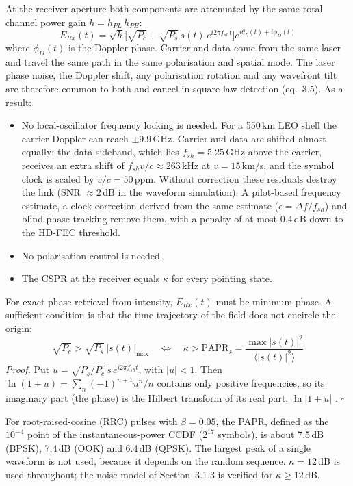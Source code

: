 At the receiver aperture both components are attenuated by the same total channel power gain $h=h_{PL}\,h_{PE}$:
\begin{equation}
E_{Rx}(t)=\sqrt{h}\Big[\sqrt{P_c}+\sqrt{P_s}\,s(t)\,e^{i2\pi f_{sh}t}\Big]e^{i\theta_L(t)+i\phi_D(t)}
\end{equation}
where $\phi_D(t)$ is the Doppler phase. Carrier and data come from the same laser and travel the same path in the same polarisation and spatial mode. The laser phase noise, the Doppler shift, any polarisation rotation and any wavefront tilt are therefore common to both and cancel in square-law detection (eq.~3.5). As a result:
\begin{itemize}
\item No local-oscillator frequency locking is needed. For a 550\,km LEO shell the carrier Doppler can reach $\pm9.9$\,GHz. Carrier and data are shifted almost equally; the data sideband, which lies $f_{sh}=5.25$\,GHz above the carrier, receives an extra shift of $f_{sh}v/c\approx263$\,kHz at $v=15$\,km/s, and the symbol clock is scaled by $v/c=50$\,ppm. Without correction these residuals destroy the link (SNR $\approx2$\,dB in the waveform simulation). A pilot-based frequency estimate, a clock correction derived from the same estimate ($\epsilon=\Delta f/f_{sh}$) and blind phase tracking remove them, with a penalty of at most 0.4\,dB down to the HD-FEC threshold.
\item No polarisation control is needed.
\item The CSPR at the receiver equals $\kappa$ for every pointing state.
\end{itemize}

For exact phase retrieval from intensity, $E_{Rx}(t)$ must be minimum phase. A sufficient condition is that the time trajectory of the field does not encircle the origin:
\begin{equation}
\sqrt{P_c}>\sqrt{P_s}\,|s(t)|_{\max}\quad\Longleftrightarrow\quad \kappa>\mathrm{PAPR}_s=\frac{\max|s(t)|^2}{\langle|s(t)|^2\rangle}
\end{equation}
\emph{Proof.} Put $u=\sqrt{P_s/P_c}\,s\,e^{i2\pi f_{sh}t}$, with $|u|<1$. Then $\ln(1+u)=\sum_n(-1)^{n+1}u^n/n$ contains only positive frequencies, so its imaginary part (the phase) is the Hilbert transform of its real part, $\ln|1+u|$ \cite{mecozzi2016}. \hfill$\square$

For root-raised-cosine (RRC) pulses with $\beta=0.05$, the PAPR, defined as the $10^{-4}$ point of the instantaneous-power CCDF ($2^{17}$ symbols), is about 7.5\,dB (BPSK), 7.4\,dB (OOK) and 6.4\,dB (QPSK). The largest peak of a single waveform is not used, because it depends on the random sequence. $\kappa=12$\,dB is used throughout; the noise model of Section~3.1.3 is verified for $\kappa\ge12$\,dB.

